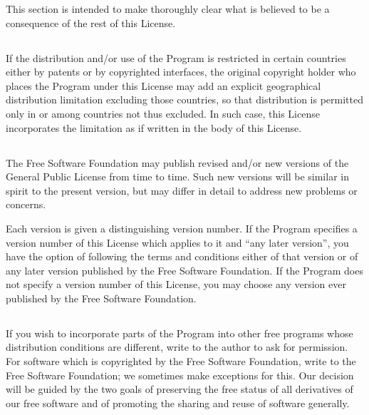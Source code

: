 \documentclass[a4paper, 12pt]{article}
\begin{document}
\vspace{0.3cm}

This section is intended to make thoroughly clear what is believed to be a consequence of the rest of this License.

\subsection{}

If the distribution and/or use of the Program is restricted in certain countries either by patents or by copyrighted interfaces, the original copyright holder who places the Program under this License may add an explicit geographical distribution limitation excluding those countries, so that distribution is permitted only in or among countries not thus excluded. In such case, this License incorporates the limitation as if written in the body of this License.

\subsection{}

The Free Software Foundation may publish revised and/or new versions of the General Public License from time to time. Such new versions will be similar in spirit to the present version, but may differ in detail to address new problems or concerns.

\vspace{0.3cm}

Each version is given a distinguishing version number. If the Program specifies a version number of this License which applies to it and ``any later version'', you have the option of following the terms and conditions either of that version or of any later version published by the Free Software Foundation. If the Program does not specify a version number of this License, you may choose any version ever published by the Free Software Foundation.

\subsection{}

If you wish to incorporate parts of the Program into other free programs whose distribution conditions are different, write to the author to ask for permission. For software which is copyrighted by the Free Software Foundation, write to the Free Software Foundation; we sometimes make exceptions for this. Our decision will be guided by the two goals of preserving the free status of all derivatives of our free software and of promoting the sharing and reuse of software generally.
\end{document}
